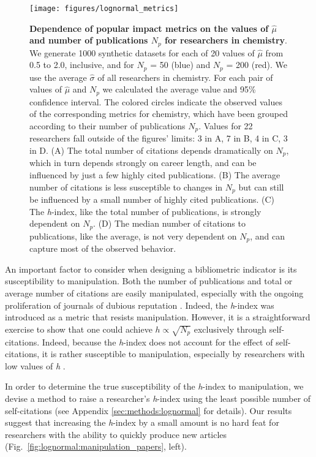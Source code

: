 \begin{figure}[t]
\texttt{[image: figures/lognormal\_metrics]}
\caption[Dependence of popular impact metrics on the values of $\hat{\mu}$ and $N_p$.]{\textbf{Dependence of popular impact metrics on the values of $\hat{\mu}$ and number of publications $N_p$ for researchers in chemistry}. We generate 1000 synthetic datasets for each of 20 values of $\hat{\mu}$ from 0.5 to 2.0, inclusive, and for $N_p$ = 50 (blue) and $N_p$ = 200 (red). We use the average $\hat{\sigma}$ of all researchers in chemistry. For each pair of values of $\hat{\mu}$ and $N_p$ we calculated the average value and 95\% confidence interval. The colored circles indicate the observed values of the corresponding metrics for chemistry, which have been grouped according to their number of publications $N_p$. Values for 22 researchers fall outside of the figures' limits: 3 in A, 7 in B, 4 in C, 3 in D. (A) The total number of citations depends dramatically on $N_p$, which in turn depends strongly on career length, and can be influenced by just a few highly cited publications. (B) The average number of citations is less susceptible to changes in $N_p$ but can still be influenced by a small number of highly cited publications. (C) The \emph{h}-index, like the total number of publications, is strongly dependent on $N_p$. (D) The median number of citations to publications, like the average, is not very dependent on $N_p$, and can capture most of the observed behavior.}
\label{fig:lognormal:metrics}
\end{figure}

An important factor to consider when designing a bibliometric indicator is its susceptibility to manipulation. Both the number of publications and total or average number of citations are easily manipulated, especially with the ongoing proliferation of journals of dubious reputation \cite{Bohannon2013, Butler2013}. Indeed, the \emph{h}-index was introduced as a metric that resists manipulation. However, it is a straightforward exercise to show that one could achieve $h \propto \sqrt{N_p}$ exclusively through self-citations. Indeed, because the \emph{h}-index does not account for the effect of self-citations, it is rather susceptible to manipulation, especially by researchers with low values of \emph{h} \cite{Schreiber2007,Engqvist2008}.

In order to determine the true susceptibility of the \emph{h}-index to manipulation, we devise a method to raise a researcher's \emph{h}-index using the least possible number of self-citations (see Appendix \ref{sec:methods:lognormal} for details). Our results suggest that increasing the \emph{h}-index by a small amount is no hard feat for researchers with the ability to quickly produce new articles (Fig.~\ref{fig:lognormal:manipulation_papers}, left).

